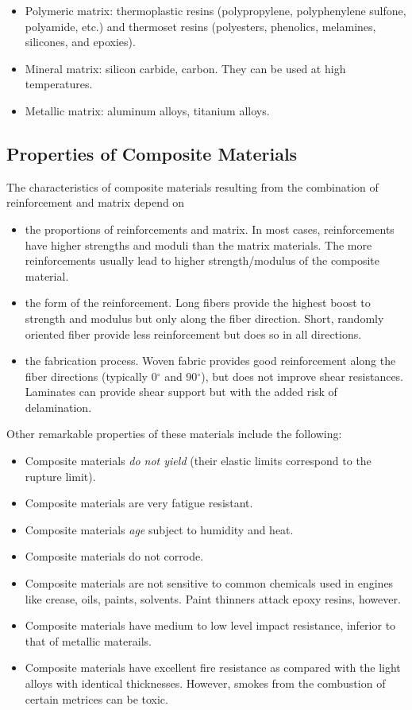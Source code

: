 \documentclass[
10pt,
a4paper,
openany,
svgnames,
]{book}
\begin{document}
\begin{itemize}
\item Polymeric matrix: thermoplastic resins (polypropylene, polyphenylene sulfone, polyamide, etc.) and thermoset resins (polyesters, phenolics, melamines, silicones, and epoxies).
\item Mineral matrix: silicon carbide, carbon. They can be used at high temperatures.
\item Metallic matrix: aluminum alloys, titanium alloys.
\end{itemize}

\subsection{Properties of Composite Materials}

The characteristics of composite materials resulting from the combination of reinforcement and matrix depend on

\begin{itemize}
\item the proportions of reinforcements and matrix. In most cases, reinforcements have higher strengths and moduli than the matrix materials. The more reinforcements usually lead to higher strength/modulus of the composite material.
\item the form of the reinforcement. Long fibers provide the highest boost to strength and modulus but only along the fiber direction. Short, randomly oriented fiber provide less reinforcement but does so in all directions.
\item the fabrication process. Woven fabric provides good reinforcement along the fiber directions (typically 0$^{\circ}$ and 90$^{\circ}$), but does not improve shear resistances. Laminates can provide shear support but with the added risk of delamination.
\end{itemize}

Other remarkable properties of these materials include the following:

\begin{itemize}
\item Composite materials \emph{do not yield} (their elastic limits correspond to the rupture limit).
\item Composite materials are very fatigue resistant.
\item Composite materials \emph{age} subject to humidity and heat.
\item Composite materials do not corrode.
\item Composite materials are not sensitive to common chemicals used in engines like crease, oils, paints, solvents. Paint thinners attack epoxy resins, however.
\item Composite materials have medium to low level impact resistance, inferior to that of metallic materails.
\item Composite materials have excellent fire resistance as compared with the light alloys with identical thicknesses. However, smokes from the combustion of certain metrices can be toxic.
\end{itemize}
\end{document}
